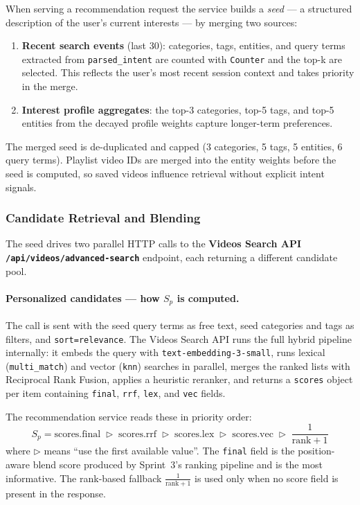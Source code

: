When serving a recommendation request the service builds a \emph{seed} — a structured
description of the user's current interests — by merging two sources:

\begin{enumerate}
  \item \textbf{Recent search events} (last 30): categories, tags, entities, and query terms
    extracted from \texttt{parsed\_intent} are counted with \texttt{Counter} and the top-k are
    selected. This reflects the user's most recent session context and takes priority in the
    merge.
  \item \textbf{Interest profile aggregates}: the top-3 categories, top-5 tags, and top-5
    entities from the decayed profile weights capture longer-term preferences.
\end{enumerate}

The merged seed is de-duplicated and capped (3 categories, 5 tags, 5 entities, 6 query terms).
Playlist video IDs are merged into the entity weights before the seed is computed, so
saved videos influence retrieval without explicit intent signals.

\subsubsection{Candidate Retrieval and Blending}

The seed drives two parallel HTTP calls to the \textbf{Videos Search API
\texttt{/api/videos/advanced-search}} endpoint, each returning a different candidate pool.

\paragraph{Personalized candidates — how $S_p$ is computed.}
The call is sent with the seed query terms as free text, seed categories and tags as filters,
and \texttt{sort=relevance}. The Videos Search API runs the full hybrid pipeline internally:
it embeds the query with \texttt{text-embedding-3-small}, runs lexical
(\texttt{multi\_match}) and vector (\texttt{knn}) searches in parallel, merges the ranked
lists with Reciprocal Rank Fusion, applies a heuristic reranker, and returns a
\texttt{scores} object per item containing \texttt{final}, \texttt{rrf}, \texttt{lex},
and \texttt{vec} fields.

The recommendation service reads these in priority order:
\[
  S_p = \text{scores.final} \;\rhd\; \text{scores.rrf} \;\rhd\; \text{scores.lex}
        \;\rhd\; \text{scores.vec} \;\rhd\; \frac{1}{\text{rank}+1}
\]
where $\rhd$ means ``use the first available value''. The \texttt{final} field is the
position-aware blend score produced by Sprint~3's ranking pipeline and is the most
informative. The rank-based fallback $\frac{1}{\text{rank}+1}$ is used only when no score
field is present in the response.

